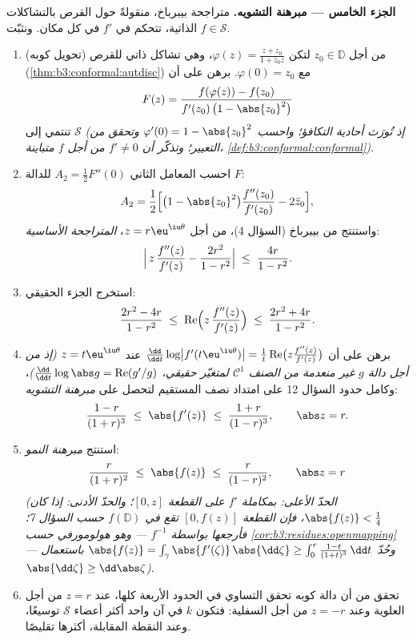 \begin{problem}
\medskip
\noindent\textbf{الجزء الخامس --- مبرهنة التشويه.} متراجحة
بيبرباخ، منقولةً حول القرص بالتشاكلات الذاتية، تتحكم في $f'$
في كل مكان. ونثبّت $f \in \mathcal
S$.
\begin{enumerate}[resume]
  \item (تحويل كوبه) من أجل $z_0 \in \mathbb D$ لتكن $\varphi(z) = \frac{z + z_0}{1 + \bar z_0z}$، وهي تشاكل
        ذاتي للقرص (\cref{thm:b3:conformal:autdisc}) مع $\varphi(0) = z_0$. برهن على أن
        \[
        F(z) = \frac{f(\varphi(z)) - f(z_0)}
        {f'(z_0)\,\bigl(1 - \abs{z_0}^2\bigr)}
        \]
        تنتمي إلى $\mathcal S$ \emph{(إذ تُورَث أحادية
        التكافؤ؛ واحسب $\varphi'(0) = 1 - \abs{z_0}^2$ وتحقق من التعيير؛ وتذكّر أن
        $f' \neq 0$ من أجل $f$ متباينة، \cref{def:b3:conformal:conformal})}.
  \item احسب المعامل الثاني $A_2 = \frac12F''(0)$ للدالة $F$:
        \[
        A_2 = \frac12\Bigl[\bigl(1 - \abs{z_0}^2\bigr)
        \frac{f''(z_0)}{f'(z_0)} - 2\bar z_0\Bigr] ,
        \]
        واستنتج من بيبرباخ (السؤال 4)، من أجل $z =
        r\eu^{\iu\theta}$،
        \emph{المتراجحة الأساسية}:
        \[
        \Bigl|\,z\,\frac{f''(z)}{f'(z)} -
        \frac{2r^2}{1 - r^2}\Bigr|
        \;\leq\; \frac{4r}{1 - r^2} .
        \]
  \item استخرج الجزء الحقيقي:
        \[
        \frac{2r^2 - 4r}{1 - r^2} \;\leq\;
        \operatorname{Re}\Bigl(z\,\frac{f''(z)}{f'(z)}\Bigr)
        \;\leq\; \frac{2r^2 + 4r}{1 - r^2} .
        \]
  \item برهن على أن $\frac{\dd}{\dd t}\log\bigl|
        f'(t\eu^{\iu\theta})\bigr| = \frac1t
        \operatorname{Re}\bigl(z\frac{f''(z)}{f'(z)}\bigr)$ عند $z = t\eu^{\iu\theta}$ \emph{(إذ من أجل دالة
        $g$ غير منعدمة من الصنف $\mathcal C^1$ لمتغيّر حقيقي،
        $\frac{\dd}{\dd t}\log\abs g =
        \operatorname{Re}(g'/g)$)}، وكامل حدود السؤال 12 على امتداد نصف
        المستقيم لتحصل على \emph{مبرهنة التشويه}:
        \[
        \frac{1 - r}{(1 + r)^3} \;\leq\; \abs{f'(z)}
        \;\leq\; \frac{1 + r}{(1 - r)^3},
        \qquad \abs z = r .
        \]
  \item استنتج \emph{مبرهنة النمو}:
        \[
        \frac{r}{(1 + r)^2} \;\leq\; \abs{f(z)} \;\leq\;
        \frac{r}{(1 - r)^2},
        \qquad \abs z = r
        \]
        \emph{(الحدّ الأعلى: بمكاملة $f'$ على القطعة
        $[0, z]$؛ والحدّ الأدنى: إذا كان $\abs{f(z)} < \frac14$، فإن القطعة
        $[0, f(z)]$ تقع في $f(\mathbb D)$ حسب السؤال 7؛
        فأرجعها بواسطة $f^{-1}$ --- وهو هولومورفي حسب
        \cref{cor:b3:residues:openmapping} --- وحُدّ $\abs{f(z)} = \int_\gamma\abs{f'(\zeta)}
        \,\abs{\dd\zeta} \geq \int_0^r\frac{1 - t}{(1 +
        t)^3}\,\dd t$ باستعمال $\abs{\dd\zeta} \geq
        \dd\abs\zeta$)}.
  \item تحقق من أن دالة كوبه تحقق التساوي في الحدود الأربعة
        كلها، عند $z = r$ من أجل العلوية وعند $z = -r$ من أجل
        السفلية: فتكون $k$ في آن واحد أكثر أعضاء
        $\mathcal S$ توسيعًا، وعند النقطة المقابلة، أكثرها
        تقليصًا.
\end{enumerate}


\end{problem}
